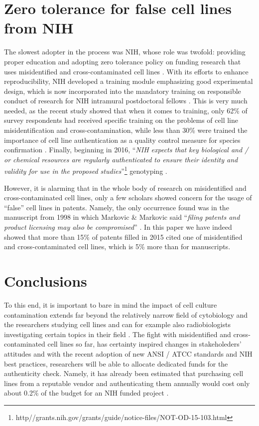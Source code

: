 \documentclass[12pt]{article}
\begin{document}
\section*{Zero tolerance for false cell lines from NIH}
The slowest adopter in the process was NIH, whose role was twofold: providing proper education and adopting zero tolerance policy on funding research that uses misidentified and cross-contaminated cell lines \cite{lorsch2014fixing}. With its efforts to enhance reproducibility, NIH developed a training module emphasizing good experimental design, which is now incorporated into the mandatory training on responsible conduct of research for NIH intramural postdoctoral fellows \cite{collins2014nih}. This is very much needed, as the recent study showed that when it comes to training, only 62\% of survey respondents had received specific training on the problems of cell line misidentification and cross-contamination, while less than 30\% were trained the importance of cell line authentication as a quality control measure for species confirmation \cite{freedman2014culture}. Finally, beginning in 2016, ``\textit{NIH expects that key biological and / or chemical resources are regularly authenticated to ensure their identity and validity for use in the proposed studies}''\footnote{http//grants.nih.gov/grants/guide/notice-files/NOT-OD-15-103.html}  genotyping \cite{masters2012authentication}.

However, it is alarming that in the whole body of research on misidentified and cross-contaminated cell lines, only a few scholars showed concern for the usage of ``false'' cell lines in patents. Namely, the only occurrence found was in the manuscript from 1998 in which Markovic \& Markovic said ``\textit{filing patents and product licensing may also be compromised}'' \cite{markovic1998cell}. In this paper we have indeed showed that more than 15\% of patents filled in 2015 cited one of misidentified and cross-contaminated cell lines, which is 5\% more than for manuscripts.

\section*{Conclusions}
To this end, it is important to bare in mind the impact of cell culture contamination extends far beyond the relatively narrow field of cytobiology and the researchers studying cell lines and can for example also  radiobiologists investigating certain topics in their field \cite{lucey2009henrietta}. The fight with misidentified and cross-contaminated cell lines so far, has certainty inspired changes in stakeholeders' attitudes and with the recent adoption of new ANSI / ATCC standards and NIH best practices, researchers will be able to allocate dedicated funds for the authenticity check. Namely, it has already been estimated that purchasing cell lines from a reputable vendor and authenticating them annually would cost only about 0.2\% of the budget for an NIH funded project \cite{freedman2015economics}. 
\end{document}
